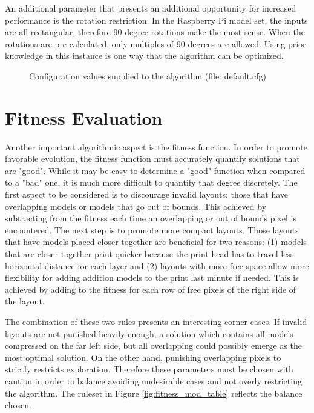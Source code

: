 \documentclass[conference]{IEEEtran}
\begin{document}
An additional parameter that presents an additional opportunity for increased performance is the rotation restriction. In the Raspberry Pi model set, the inputs are all rectangular, therefore 90 degree rotations make the most sense. When the rotations are pre-calculated, only multiples of 90 degrees are allowed. Using prior knowledge in this instance is one way that the algorithm can be optimized.

\begin{figure}[ht]
\centering

\caption{Configuration values supplied to the algorithm (file: default.cfg)}
\label{fig:cfg_file}
\end{figure}

\section{Fitness Evaluation}
Another important algorithmic aspect is the fitness function. In order to promote favorable evolution, the fitness function must accurately quantify solutions that are "good". While it may be easy to determine a "good" function when compared to a "bad" one, it is much more difficult to quantify that degree discretely. The first aspect to be considered is to discourage invalid layouts: those that have overlapping models or models that go out of bounds. This achieved by subtracting from the fitness each time an overlapping or out of bounds pixel is encountered. The next step is to promote more compact layouts. Those layouts that have models placed closer together are beneficial for two reasons: (1) models that are closer together print quicker because the print head has to travel less horizontal distance for each layer and (2) layouts with more free space allow more flexibility for adding addition models to the print last minute if needed. This is achieved by adding to the fitness for each row of free pixels of the right side of the layout. 

The combination of these two rules presents an interesting corner cases. If invalid layouts are not punished heavily enough, a solution which contains all models compressed on the far left side, but all overlapping could possibly emerge as the most optimal solution. On the other hand, punishing overlapping pixels to strictly restricts exploration. Therefore these parameters must be chosen with caution in order to balance avoiding undesirable cases and not overly restricting the algorithm. The ruleset in Figure \ref{fig:fitness_mod_table} reflects the balance chosen.
\end{document}
